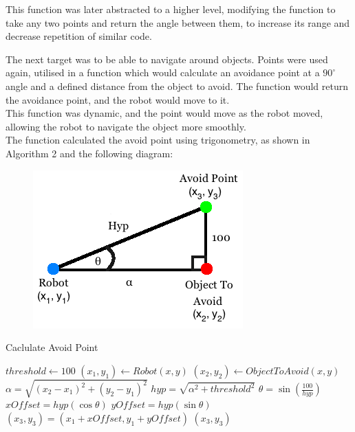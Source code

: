 This function was later abstracted to a higher level, modifying the function to take any two points and return the angle between them, to increase its range and decrease repetition of similar code. \linebreak

The next target was to be able to navigate around objects. Points were used again, utilised in a function which would calculate an avoidance point at a $90^{\circ}$ angle and a defined distance from the object to avoid. The function would return the avoidance point, and the robot would move to it. \\
This function was dynamic, and the point would move as the robot moved, allowing the robot to navigate the object more smoothly.\\
The function calculated the avoid point using trigonometry, as shown in Algorithm 2 and the following diagram:
\begin{center}
\begin{figure}[htp]
\leavevmode
\includegraphics[scale=0.6]{images/AvoidPoints.png}
\label{AvoidPointDiagram}
\end{figure}
\end{center}

\begin{algorithm}
\caption{Caclulate Avoid Point}
\label{avoidPoint}
\begin{algorithmic}[1]
\STATE $threshold \gets 100$
\STATE $(x_{1}, y_{1}) \gets Robot (x, y)$
\STATE $(x_{2}, y_{2}) \gets Object To Avoid (x, y)$
\STATE $\alpha = \sqrt{(x_{2} - x_{1})^{2} + (y_{2} - y_{1})^{2}}$
\STATE $hyp = \sqrt{\alpha^{2} + threshold^{2}}$
\STATE $\theta = \sin(\frac{100}{hyp})$
\STATE $xOffset = hyp(\cos\theta)$
\STATE $yOffset = hyp(\sin\theta)$
\STATE $(x_{3}, y_{3}) = (x_{1} + xOffset, y_{1} + yOffset)$
\RETURN $(x_{3}, y_{3})$
\end{algorithmic}
\end{algorithm}

